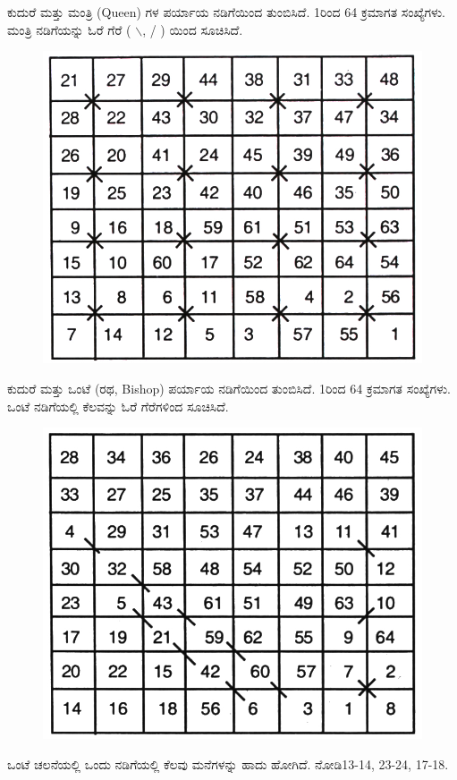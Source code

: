 ಕುದುರೆ ಮತ್ತು ಮಂತ್ರಿ (Queen) ಗಳ ಪರ್ಯಾಯ ನಡಿಗೆಯಿಂದ ತುಂಬಿಸಿದೆ. 1ರಿಂದ 64 ಕ್ರಮಾಗತ ಸಂಖ್ಯೆಗಳು. ಮಂತ್ರಿ ನಡಿಗೆಯನ್ನು ಓರೆ ಗೆರೆ ( $\backslash$, / ) ಯಿಂದ ಸೂಚಿಸಿದೆ.
\begin{figure}[H]
\includegraphics{src/figures/chap6/fig6.23.jpg}
\end{figure}

ಕುದುರೆ ಮತ್ತು ಒಂಟೆ (ರಥ, Bishop) ಪರ್ಯಾಯ ನಡಿಗೆಯಿಂದ ತುಂಬಿಸಿದೆ. 1ರಿಂದ 64 ಕ್ರಮಾಗತ ಸಂಖ್ಯೆಗಳು. ಒಂಟೆ ನಡಿಗೆಯಲ್ಲಿ ಕೆಲವನ್ನು ಓರೆ ಗೆರೆಗಳಿಂದ ಸೂಚಿಸಿದೆ.
\begin{figure}[H]
\includegraphics{src/figures/chap6/fig6.24.jpg}
\end{figure}

ಒಂಟೆ ಚಲನೆಯಲ್ಲಿ ಒಂದು ನಡಿಗೆಯಲ್ಲಿ ಕೆಲವು ಮನೆಗಳನ್ನು ಹಾದು ಹೋಗಿದೆ. ನೋಡಿ13-14, 23-24, 17-18.
